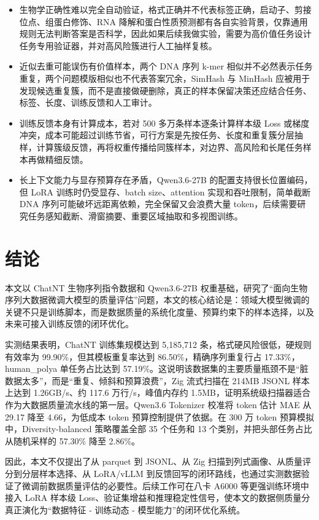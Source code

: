 \documentclass{article}
\begin{document}
\begin{itemize}
    \item[$\divideontimes$] 生物学正确性难以完全自动验证，格式正确并不代表标签正确，启动子、剪接位点、组蛋白修饰、RNA 降解和蛋白性质预测都有各自实验背景，仅靠通用规则无法判断答案是否科学，因此如果后续我做实验，需要为高价值任务设计任务专用验证器，并对高风险簇进行人工抽样复核。
    \item[$\divideontimes$] 近似去重可能误伤有价值样本，两个 DNA 序列 k-mer 相似并不必然表示任务重复，两个问题模版相似也不代表答案冗余，SimHash 与 MinHash 应被用于发现候选重复簇，而不是直接做硬删除，真正的样本保留决策还应结合任务、标签、长度、训练反馈和人工审计。
    \item[$\divideontimes$] 训练反馈本身有计算成本，若对 500 多万条样本逐条计算样本级 Loss 或梯度冲突，成本可能超过训练节省，可行方案是先按任务、长度和重复簇分层抽样，计算簇级反馈，再将权重传播给同簇样本，对边界、高风险和长尾任务样本再做精细反馈。
    \item[$\divideontimes$] 长上下文能力与显存预算存在矛盾，Qwen3.6-27B 的配置支持很长位置编码，但 LoRA 训练时仍受显存、batch size、attention 实现和吞吐限制，简单截断 DNA 序列可能破坏远距离依赖，完全保留又会浪费大量 token，后续需要研究任务感知截断、滑窗摘要、重要区域抽取和多视图训练。
\end{itemize}



\section{结论}
本文以 ChatNT 生物序列指令数据和 Qwen3.6-27B 权重基础，研究了“面向生物序列大数据微调大模型的质量评估”问题，本文的核心结论是：领域大模型微调的关键不只是训练脚本，而是数据质量的系统化度量、预算约束下的样本选择，以及未来可接入训练反馈的闭环优化。

实测结果表明，ChatNT 训练集规模达到 5,185,712 条，格式硬风险很低，硬规则有效率为 99.90\%，但其模板重复率达到 86.50\%，精确序列重复行占 17.33\%，human\_polya 单任务占比达到 57.19\%。这说明该数据集的主要质量瓶颈不是“脏数据太多”，而是“重复、倾斜和预算浪费”，Zig 流式扫描在 214MB JSONL 样本上达到 1.26GB/s、约 117.6 万行/s，峰值内存约 1.5MB，证明系统级扫描器适合作为大数据质量流水线的第一层。Qwen3.6 Tokenizer 校准将 token 估计 MAE 从 29.17 降至 4.66，为低成本 token 预算控制提供了依据。在 300 万 token 预算模拟中，Diversity-balanced 策略覆盖全部 35 个任务和 13 个类别，并把头部任务占比从随机采样的 57.30\% 降至 2.86\%。

因此，本文不仅提出了从 parquet 到 JSONL、从 Zig 扫描到列式画像、从质量评分到分层样本选择、从 LoRA/vLLM 到反馈回写的闭环路线，也通过实测数据验证了微调前数据质量评估的必要性。后续工作可在八卡 A6000 等更强训练环境中接入 LoRA 样本级 Loss、验证集增益和推理稳定性信号，使本文的数据侧质量分真正演化为“数据特征 - 训练动态 - 模型能力”的闭环优化系统。
\end{document}
